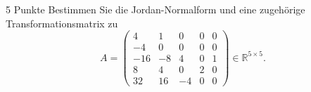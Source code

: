 \documentclass{problemset}
\author{Michael van Straten}
\begin{document}
\maketitle

\begin{problem}{5 Punkte}
Bestimmen Sie die Jordan-Normalform und eine zugehörige Transformationsmatrix zu
\[
    A = \begin{pmatrix}
        4   & 1  & 0  & 0 & 0 \\
        -4  & 0  & 0  & 0 & 0 \\
        -16 & -8 & 4  & 0 & 1 \\
        8   & 4  & 0  & 2 & 0 \\
        32  & 16 & -4 & 0 & 0
    \end{pmatrix} \in \mathbb{R}^{5 \times 5}.
\]
\end{problem}
\end{document}

